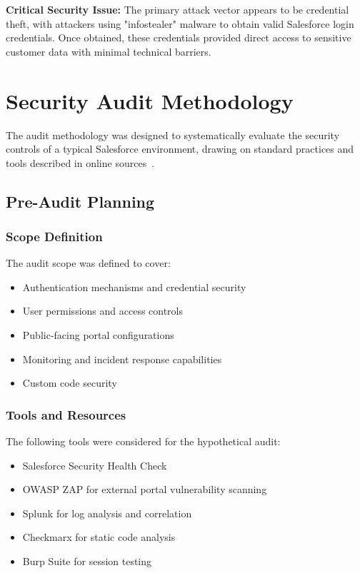 \documentclass[12pt,a4paper]{article}
\begin{document}
\begin{keyfinding}
\textbf{Critical Security Issue:} The primary attack vector appears to be credential theft, with attackers using "infostealer" malware to obtain valid Salesforce login credentials. Once obtained, these credentials provided direct access to sensitive customer data with minimal technical barriers.
\end{keyfinding}

\section{Security Audit Methodology}
The audit methodology was designed to systematically evaluate the security controls of a typical Salesforce environment, drawing on standard practices and tools described in online sources~\cite{capstorm2023,foundhq2025,onilab2024,salesforce2025,sentinelone2024,sonar2025}.

\subsection{Pre-Audit Planning}
\subsubsection{Scope Definition}
The audit scope was defined to cover:
\begin{itemize}
    \item Authentication mechanisms and credential security
    \item User permissions and access controls
    \item Public-facing portal configurations
    \item Monitoring and incident response capabilities
    \item Custom code security
\end{itemize}

\subsubsection{Tools and Resources}
The following tools were considered for the hypothetical audit:
\begin{itemize}
    \item Salesforce Security Health Check
    \item OWASP ZAP for external portal vulnerability scanning
    \item Splunk for log analysis and correlation
    \item Checkmarx for static code analysis
    \item Burp Suite for session testing
\end{itemize}
\end{document}
